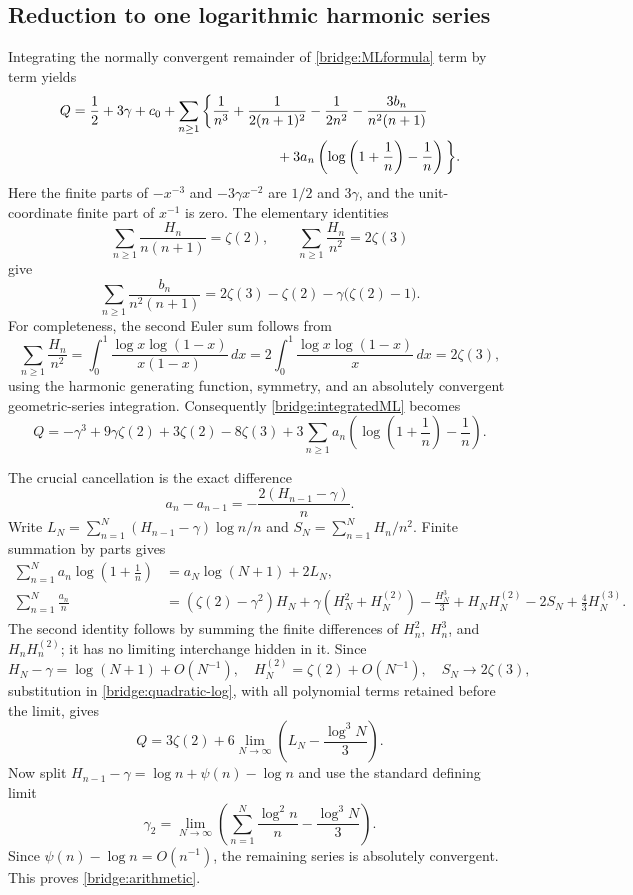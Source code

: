\documentclass[11pt]{article}
\numberwithin{equation}{section}
\theoremstyle{definition}
\theoremstyle{remark}
\begin{document}
\subsection{Reduction to one logarithmic harmonic series}

Integrating the normally convergent remainder of
\eqref{bridge:MLformula} term by term yields
\begin{align}
 Q={}&\frac12+3\gamma+c_0
  +\sum_{n\ge1}\bigg\{
    \frac1{n^3}+\frac1{2(n+1)^2}-\frac1{2n^2}
     -\frac{3b_n}{n^2(n+1)}\notag\\
 &\hspace{47mm}
     +3a_n\left(\log\left(1+\frac1n\right)-\frac1n\right)
     \bigg\}.
 \label{bridge:integratedML}
\end{align}
Here the finite parts of $-x^{-3}$ and $-3\gamma x^{-2}$ are
$1/2$ and $3\gamma$, and the unit-coordinate finite part of
$x^{-1}$ is zero.  The elementary identities
\[
 \sum_{n\ge1}\frac{H_n}{n(n+1)}=\zeta(2),\qquad
 \sum_{n\ge1}\frac{H_n}{n^2}=2\zeta(3)
\]
give
\[
 \sum_{n\ge1}\frac{b_n}{n^2(n+1)}
   =2\zeta(3)-\zeta(2)-\gamma\bigl(\zeta(2)-1\bigr).
\]
For completeness, the second Euler sum follows from
\[
 \sum_{n\ge1}\frac{H_n}{n^2}
 =\int_0^1\frac{\log x\log(1-x)}{x(1-x)}\,dx
 =2\int_0^1\frac{\log x\log(1-x)}x\,dx
 =2\zeta(3),
\]
using the harmonic generating function, symmetry, and an absolutely
convergent geometric-series integration.
Consequently \eqref{bridge:integratedML} becomes
\begin{equation}\label{bridge:quadratic-log}
 Q=-\gamma^3+9\gamma\zeta(2)+3\zeta(2)-8\zeta(3)
  +3\sum_{n\ge1}a_n
       \left(\log\left(1+\frac1n\right)-\frac1n\right).
\end{equation}

The crucial cancellation is the exact difference
\[
 a_n-a_{n-1}=-\frac{2(H_{n-1}-\gamma)}n.
\]
Write
$L_N=\sum_{n=1}^N(H_{n-1}-\gamma)\log n/n$ and
$S_N=\sum_{n=1}^N H_n/n^2$.  Finite summation by parts gives
\begin{align*}
 \sum_{n=1}^N a_n\log\left(1+\frac1n\right)
 &=a_N\log(N+1)+2L_N,\\
 \sum_{n=1}^N\frac{a_n}{n}
 &=(\zeta(2)-\gamma^2)H_N+
      \gamma(H_N^2+H_N^{(2)})-\frac{H_N^3}{3}
       +H_NH_N^{(2)}-2S_N+\frac43H_N^{(3)}.
\end{align*}
The second identity follows by summing the finite differences of
$H_n^2$, $H_n^3$, and $H_nH_n^{(2)}$; it has no limiting
interchange hidden in it.  Since
\[
 H_N-\gamma=\log(N+1)+O(N^{-1}),\quad
 H_N^{(2)}=\zeta(2)+O(N^{-1}),\quad S_N\longrightarrow2\zeta(3),
\]
substitution in \eqref{bridge:quadratic-log}, with all polynomial
terms retained before the limit, gives
\begin{equation}\label{bridge:limit}
 Q=3\zeta(2)+6\lim_{N\to\infty}
       \left(L_N-\frac{\log^3 N}{3}\right).
\end{equation}
Now split $H_{n-1}-\gamma=\log n+\psi(n)-\log n$ and use the
standard defining limit
\[
 \gamma_2=\lim_{N\to\infty}
   \left(\sum_{n=1}^N\frac{\log^2 n}{n}-\frac{\log^3 N}{3}\right).
\]
Since $\psi(n)-\log n=O(n^{-1})$, the remaining series is absolutely
convergent.  This proves \eqref{bridge:arithmetic}.
\end{document}
